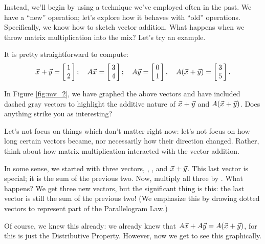 Instead, we'll begin by using a technique we've employed often in the past. We have a ``new'' operation; let's explore how it behaves with ``old'' operations. Specifically, we know how to sketch vector addition. What happens when we throw matrix multiplication into the mix? Let's try an example.\\

{It is pretty straightforward to compute: 
$$\vx+\vy = \bmx{c} 1\\2\emx;\quad \tta\vx = \bmx{c}3\\4\emx; \quad \tta\vy = \bmx{c} 0\\1\emx,\quad \tta(\vx+\vy) = \bmx{c} 3\\5\emx.$$

In Figure \ref{fig:mv_2}, we have graphed the above vectors and have included dashed gray vectors to highlight the additive nature of $\vec{x_{}}+\vec{y}$ and $A(\vec{x_{}}+\vec{y})$. Does anything strike you as interesting?

\begin{myfigure}%
\begin{center}
\end{center}
\label{fig:mv_2}
\end{myfigure}%

Let's not focus on things which don't matter right now: let's not focus on how long certain vectors became, nor necessarily how their direction changed. Rather, think about how matrix multiplication interacted with the vector addition.

In some sense, we started with three vectors, \vx, \vy, and $\vec{x_{}}+\vec{y}$. This last vector is special; it is the sum of the previous two. Now, multiply all three by \tta. What happens? We get three new vectors, but the significant thing is this: the last vector is still the sum of the previous two! (We emphasize this by drawing dotted vectors to represent part of the Parallelogram Law.)

Of course, we knew this already: we already knew that $A\vec{x_{}} + A\vec{y} = A(\vec{x_{}}+\vec{y})$, for this is just the Distributive Property. However, now we get to see this graphically.}\\ %

